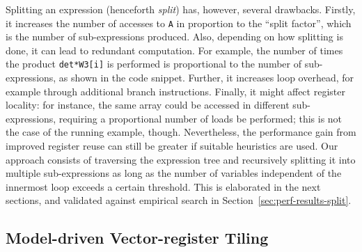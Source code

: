Splitting an expression (henceforth \emph{split}) has, however, several drawbacks. Firstly, it increases the number of accesses to \texttt{A} in proportion to the ``split factor'', which is the number of sub-expressions produced. Also, depending on how splitting is done, it can lead to redundant computation. For example, the number of times the product \texttt{det*W3[i]} is performed is proportional to the number of sub-expressions, as shown in the code snippet. Further, it increases loop overhead, for example through additional branch instructions. Finally, it might affect register locality: for instance, the same array could be accessed in different sub-expressions, requiring a proportional number of loads be performed; this is not the case of the running example, though. Nevertheless, the performance gain from improved register reuse can still be greater if suitable heuristics are used. Our approach consists of traversing the expression tree and recursively splitting it into multiple sub-expressions as long as the number of variables independent of the innermost loop exceeds a certain threshold. This is elaborated in the next sections, and validated against empirical search in Section~\ref{sec:perf-results-split}.

\subsection{Model-driven Vector-register Tiling}
\label{sec:coffee-opvect}

